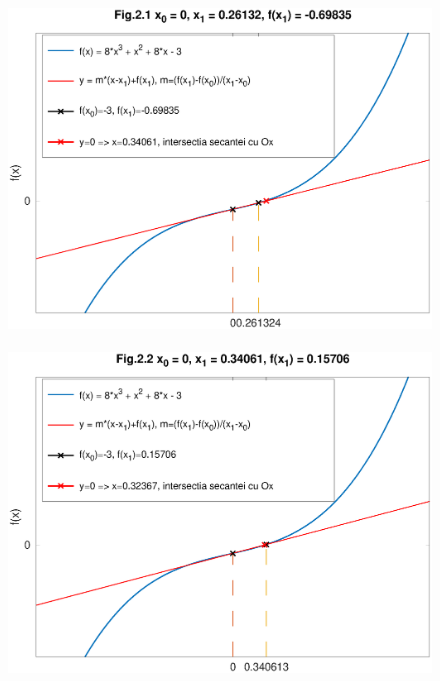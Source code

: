 \documentclass[12pt]{article}
\begin{document}
\begin{figure}[htbp]
    \begin{center}
        \includegraphics[height=90mm]{octave-fig/Fig.2.1.eps}
        \includegraphics[height=90mm]{octave-fig/Fig.2.2.eps}
    \end{center}
\end{figure}
\end{document}
